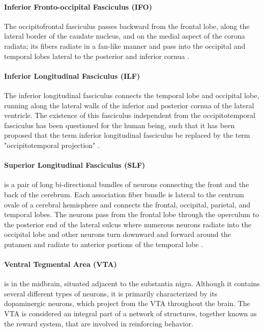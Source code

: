 \documentclass[../structure.tex]{subfiles}
\begin{document}
		\paragraph{Inferior Fronto-occipital Fasciculus (IFO)}
		The occipitofrontal fasciculus passes backward from the frontal lobe, along the lateral border of the caudate nucleus, and on the medial aspect of the corona radiata; its fibers radiate in a fan-like manner and pass into the occipital and temporal lobes lateral to the posterior and inferior cornua \cite{PDD2015}.
		\paragraph{Inferior Longitudinal Fasciculus (ILF)}
		The inferior longitudinal fasciculus connects the temporal lobe and occipital lobe, running along the lateral walls of the inferior and posterior cornua of the lateral ventricle.
The existence of this fasciculus independent from the occipitotemporal fasciculus has been questioned for the human being, such that it has been proposed that the term inferior longitudinal fasciculus be replaced by the term "occipitotemporal projection" \cite{PDD2015}.
		\paragraph{Superior Longitudinal Fasciculus (SLF)}
		is a pair of long bi-directional bundles of neurons connecting the front and the back of the cerebrum. Each association fiber bundle is lateral to the centrum ovale of a cerebral hemisphere and connects the frontal, occipital, parietal, and temporal lobes. The neurons pass from the frontal lobe through the operculum to the posterior end of the lateral sulcus where numerous neurons radiate into the occipital lobe and other neurons turn downward and forward around the putamen and radiate to anterior portions of the temporal lobe \cite{PDD2015}.
		
		\paragraph{Ventral Tegmental Area (VTA)}
		is in the midbrain, situated adjacent to the substantia nigra. Although it contains several different types of neurons, it is primarily characterized by its dopaminergic neurons, which project from the VTA throughout the brain.
		The VTA is considered an integral part of a network of structures, together known as the reward system, that are involved in reinforcing behavior.
\end{document}

